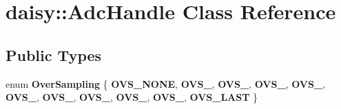 \hypertarget{classdaisy_1_1_adc_handle}{}\section{daisy\+:\+:Adc\+Handle Class Reference}
\label{classdaisy_1_1_adc_handle}
\subsection*{Public Types}
\begin{DoxyCompactItemize}
\item 
\mbox{\label{classdaisy_1_1_adc_handle_ad8bb144ed73f891cec1d10122f0ba541}} 
enum {\bfseries Over\+Sampling} \{ \newline
{\bfseries O\+V\+S\+\_\+\+N\+O\+NE}, 
{\bfseries O\+V\+S\+\_}, 
{\bfseries O\+V\+S\+\_}, 
{\bfseries O\+V\+S\+\_}, 
\newline
{\bfseries O\+V\+S\+\_}, 
{\bfseries O\+V\+S\+\_}, 
{\bfseries O\+V\+S\+\_}, 
{\bfseries O\+V\+S\+\_}, 
\newline
{\bfseries O\+V\+S\+\_}, 
{\bfseries O\+V\+S\+\_}, 
{\bfseries O\+V\+S\+\_\+\+L\+A\+ST}
 \}
\end{DoxyCompactItemize}
